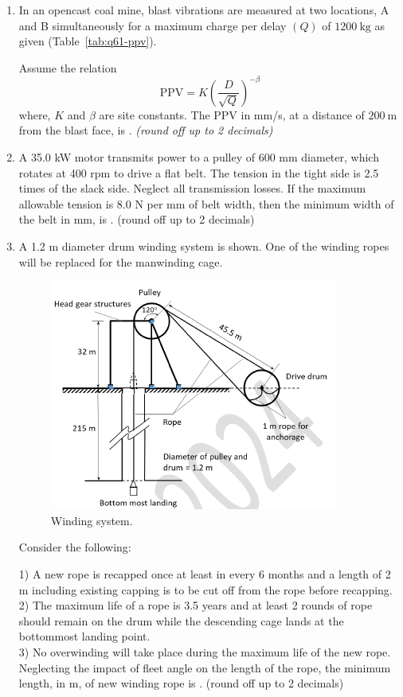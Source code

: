 \documentclass[journal]{IEEEtran}
\begin{document}
\begin{enumerate}[leftmargin=0pt]
\hfill{}
\item In an opencast coal mine, blast vibrations are measured at two locations, A and B
simultaneously for a maximum charge per delay $(Q)$ of $1200\ \mathrm{kg}$ as given
(Table~\ref{tab:q61-ppv}).


Assume the relation
\[
\mathrm{PPV}=K\left(\frac{D}{\sqrt{Q}}\right)^{-\beta}
\]
where, $K$ and $\beta$ are site constants. The PPV in mm/s, at a distance of
$200\ \mathrm{m}$ from the blast face, is \underline{\hspace{1.5cm}}.
\textit{(round off up to 2 decimals)}

\hfill{}
\item A 35.0 kW motor transmits power to a pulley of 600 mm diameter, which rotates at 400 rpm to drive a flat belt. The tension in the tight side is 2.5 times of the slack side. Neglect all transmission losses. If the maximum allowable tension is 8.0 N per mm of belt width, then the minimum width of the belt in mm, is \underline{\hspace{1.5cm}}. (round off up to 2 decimals)
\hfill{}
\item A 1.2 m diameter drum winding system is shown. One of the winding ropes will be replaced for the manwinding cage.
\begin{figure}[h!]
\centering
\includegraphics[width=0.5\linewidth]{figs/winding.png}
\caption{Winding system.}
\label{fig:winding}
\end{figure}
Consider the following:

1) A new rope is recapped once at least in every 6 months and a length of 2 m including existing capping is to be cut off from the rope before recapping.\\[0.5em]
2) The maximum life of a rope is 3.5 years and at least 2 rounds of rope should remain on the drum while the descending cage lands at the bottommost landing point.\\[0.5em]
3) No overwinding will take place during the maximum life of the new rope.\\[0.5em]
Neglecting the impact of fleet angle on the length of the rope, the minimum length, in m, of new winding rope is \underline{\hspace{1.5cm}}. (round off up to 2 decimals)


\end{enumerate}
\end{document}
